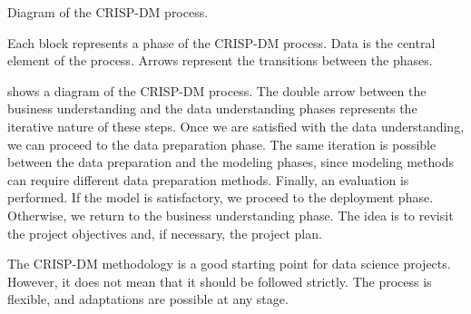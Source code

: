 \begin{figurebox}[label=fig:cripdm]{Diagram of the CRISP-DM process.}
  \centering
  \tcblower
  Each block represents a phase of the CRISP-DM process.  Data is the central element of
  the process.  Arrows represent the transitions between the phases.
\end{figurebox}

 shows a diagram of the CRISP-DM process.  The double arrow between the
business understanding and the data understanding phases represents the iterative nature
of these steps.  Once we are satisfied with the data understanding, we can proceed to
the data preparation phase.  The same iteration is possible between the data preparation
and the modeling phases, since modeling methods can require different data preparation
methods. Finally, an evaluation is performed.  If the model is satisfactory, we proceed to the
deployment phase.  Otherwise, we return to the business understanding phase.  The idea
is to revisit the project objectives and, if necessary, the project plan.

The CRISP-DM methodology is a good starting point for data science projects.  However, it
does not mean that it should be followed strictly.  The process is flexible, and
adaptations are possible at any stage.

